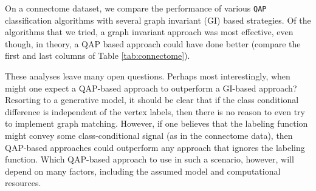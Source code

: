 \documentclass{article} %
\newcommand{\qap}{\texttt{QAP} }
\begin{document}
On a connectome dataset, we compare the performance of various \qap classification algorithms with several graph invariant (GI) based strategies.  Of the algorithms that we tried, a graph invariant approach was most effective, even though, in theory, a QAP based approach could have done better (compare the first and last columns of Table \ref{tab:connectome}).  

These analyses leave many open questions.  Perhaps most interestingly, when might one expect a QAP-based approach to outperform a GI-based approach?  Resorting to a generative model, it should be clear that if the class conditional difference is independent of the vertex labels, then there is no reason to even try to implement graph matching.  However, if one believes that the labeling function might convey some class-conditional signal (as in the connectome data), then QAP-based approaches could outperform any approach that ignores the labeling function.  Which QAP-based approach to use in such a scenario, however, will depend on many factors, including the assumed model and computational resources.


% 




%
\end{document}
